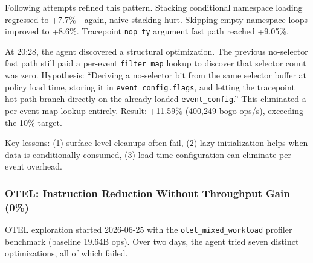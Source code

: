 \documentclass[sigplan,10pt,anonymous,nonacm]{acmart}
\begin{document}
Following attempts refined this pattern. Stacking conditional namespace loading regressed to +7.7\%---again, naive stacking hurt. Skipping empty namespace loops improved to +8.6\%. Tracepoint \texttt{nop\_ty} argument fast path reached +9.05\%.

At 20:28, the agent discovered a structural optimization. The previous no-selector fast path still paid a per-event \texttt{filter\_map} lookup to discover that selector count was zero. Hypothesis: ``Deriving a no-selector bit from the same selector buffer at policy load time, storing it in \texttt{event\_config.flags}, and letting the tracepoint hot path branch directly on the already-loaded \texttt{event\_config}.'' This eliminated a per-event map lookup entirely. Result: +11.59\% (400,249 bogo ops/s), exceeding the 10\% target.

Key lessons: (1) surface-level cleanups often fail, (2) lazy initialization helps when data is conditionally consumed, (3) load-time configuration can eliminate per-event overhead.

\subsubsection{OTEL: Instruction Reduction Without Throughput Gain (0\%)}

OTEL exploration started 2026-06-25 with the \texttt{otel\_mixed\_workload} profiler benchmark (baseline 19.64B ops). Over two days, the agent tried seven distinct optimizations, all of which failed.
\end{document}
